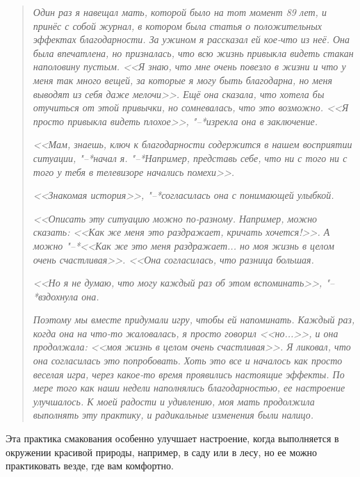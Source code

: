 \begin{quotation}
	\textit{
		Один раз я навещал мать, которой было на тот момент 89 лет, и принёс с собой журнал, в котором была статья о положительных эффектах благодарности. За ужином я рассказал ей кое-что из неё. Она была впечатлена, но призналась, что всю жизнь привыкла видеть стакан наполовину пустым. <<Я знаю, что мне очень повезло в жизни и что у меня так много вещей, за которые я могу быть благодарна, но меня выводят из себя даже мелочи>>. Ещё она сказала, что хотела бы отучиться от этой привычки, но сомневалась, что это возможно. <<Я просто привыкла видеть плохое>>, "--*изрекла она в заключение.
	}
	
	\textit{
		<<Мам, знаешь, ключ к благодарности содержится в нашем восприятии ситуации, "--*начал я. "--*Например, представь себе, что ни с того ни с того у тебя в телевизоре начались помехи>>.
	}
	
	\textit{<<Знакомая история>>, "--*согласилась она с понимающей улыбкой.}
	
	\textit{
		<<Описать эту ситуацию можно по-разному. Например, можно сказать: <<Как же меня это раздражает, кричать хочется!>>. А можно "--*<<Как же это меня раздражает... но моя жизнь в целом очень счастливая>>. <<Она согласилась, что разница большая.
	}
	
	\textit{<<Но я не думаю, что могу каждый раз об этом вспоминать>>, "--*вздохнула она.}
	
	\textit{
		Поэтому мы вместе придумали игру, чтобы ей напоминать. Каждый раз, когда она на что-то жаловалась, я просто говорил <<но...>>, и она продолжала: <<моя жизнь в целом очень счастливая>>. Я ликовал, что она согласилась это попробовать. Хоть это все и началось как просто веселая игра, через какое-то время проявились настоящие эффекты. По мере того как наши недели наполнялись благодарностью, ее настроение улучшалось. К моей радости и удивлению, моя мать продолжила выполнять эту практику, и радикальные изменения были налицо.
}
\end{quotation}

 \label{IP:Sense_and_Savor_Walk}

Эта практика смакования особенно улучшает настроение, когда выполняется в окружении красивой природы, например, в саду или в лесу, но ее можно практиковать везде, где вам комфортно.

